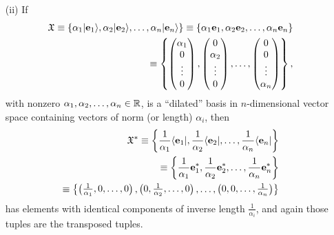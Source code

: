 {\begin{itemize}
\item[(ii)]
If
\begin{equation}
\begin{split}
{\frak X}
\equiv
\{ \alpha_1 \vert {\bf e}_1 \rangle , \alpha_2 \vert  {\bf e}_2 \rangle ,\ldots ,\alpha_n \vert {\bf e}_n \rangle  \}
\equiv
\{\alpha_1 {\bf e}_1, \alpha_2 {\bf e}_2,\ldots ,\alpha_n {\bf e}_n\}
\\
\equiv
\left\{
\begin{pmatrix}
\alpha_1\\
0\\
\vdots \\
0
\end{pmatrix}
,
\begin{pmatrix}
0\\
\alpha_2\\
\vdots \\
0
\end{pmatrix}
,
\ldots ,
\begin{pmatrix}
0\\
0\\
\vdots \\
\alpha_n
\end{pmatrix}
\right\}
,
\end{split}
\end{equation}
with nonzero $\alpha_1,\alpha_2,\ldots ,\alpha_n \in {\Bbb R}$,
is a ``dilated'' basis in $n$-dimensional vector space containing vectors of norm (or length) $\alpha_i$,
then
\begin{equation}
\begin{split}
{\frak X}^\ast
\equiv
\left\{  \frac{1}{\alpha_1 }\langle {\bf e}_1 \vert ,\frac{1}{\alpha_2 } \langle  {\bf e}_2 \vert , \ldots ,\frac{1}{\alpha_n } \langle {\bf e}_n \vert \right\}
\\
\equiv
\left \{\frac{1}{\alpha_1 }{\bf e}_1^\ast  ,\frac{1}{\alpha_2 }{\bf e}_2^\ast , \ldots ,\frac{1}{\alpha_n }{\bf e}_n^\ast  \right\}
\\
\equiv
\left\{
\begin{pmatrix}\frac{1}{\alpha_1 },0,\ldots,0\end{pmatrix},
\begin{pmatrix}0,\frac{1}{\alpha_2 },\ldots,0\end{pmatrix},
\ldots,
\begin{pmatrix}0,0,\ldots,\frac{1}{\alpha_n }\end{pmatrix}\right\}
\end{split}
\end{equation}
has elements with identical components of inverse length $\frac{1}{\alpha_i }$,
and again those tuples are the transposed tuples.


\end{itemize}}
